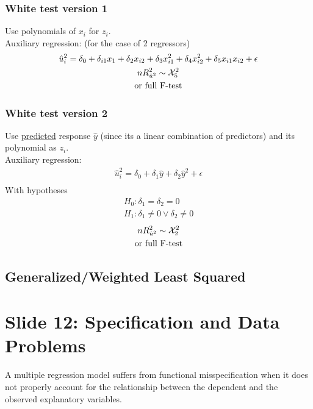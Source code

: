 \documentclass[]{article}
\begin{document}
			\subsubsection{White test version 1}
				\par Use polynomials of $x_i$ for $z_i$.\\
				Auxiliary regression: (for the case of 2 regressors)
				\begin{gather*}
					\hat{u}_i^2 = \delta_0 + \delta_{i1} x_1 + \delta_2 x_{i2} + \delta_3 x_{i1}^2 + \delta_4 x_{i2}^2 + \delta_5 x_{i1} x_{i2} + \epsilon \\
					n R^2_{\hat{u}^2} \sim \mathcal{{X}}_5^2 \\
					\text{{or full F-test}}
				\end{gather*}
			\subsubsection{White test version 2}
				\par Use \ul{predicted} response $\hat{y}$ (since its a linear combination of predictors) and its polynomial as $z_i$. \\
				Auxiliary regression:
				\begin{gather*}
					\hat{u}_i^2 = \delta_0 + \delta_1 \hat{y} + \delta_2 \hat{y}^2 + \epsilon \\
				\end{gather*}
				With hypotheses
				\begin{gather*}
					H_0: \delta_1 = \delta_2 = 0\\
					H_1: \delta_1 \neq 0 \lor \delta_2 \neq 0
				\end{gather*}
				\begin{gather*}
					n R^2_{\hat{u}^2} \sim \mathcal{{X}}_2^2 \\
					\text{{or full F-test}}
				\end{gather*}
		\subsection{Generalized/Weighted Least Squared}
	
	\section{Slide 12: Specification and Data Problems}
		\paragraph{} A multiple regression model suffers from functional misspecification when it does not properly account for the relationship between the dependent and the observed explanatory variables.
\end{document}
